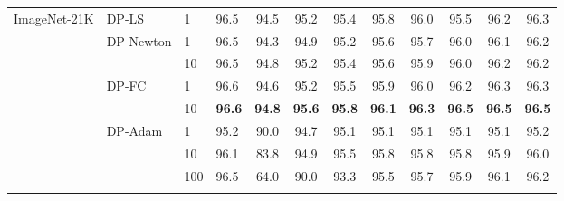 \documentclass[letterpaper]{article} \usepackage{fullpage}
\begin{document}
\begin{table*}[!h]
\begin{tabular}{llll|cccccccc}
		\multirow{8}{*}{ImageNet-21K} &    \multirow{ 1}{*}{DP-LS}
		                                                    & 1     & 96.5        & 94.5 & 95.2 & 95.4 & 95.8 & 96.0 & 95.5 & 96.2 & 96.3 \\ \addlinespace[0.1cm]
\addlinespace[0.1cm]
		                     & \multirow{ 2}{*}{DP-Newton} & 1      & 96.5        & 94.3 & 94.9 & 95.2 & 95.6 & 95.7 & 96.0 & 96.1 & 96.2 \\
		                     &                             & 10     & 96.5        & 94.8 & 95.2 & 95.4 & 95.6 & 95.9 & 96.0 & 96.2 & 96.2 \\
		\addlinespace[0.1cm]
\addlinespace[0.1cm]
		                     & \multirow{ 2}{*}{DP-FC}     & 1      & 96.6        & 94.6 & 95.2 & 95.5 & 95.9 & 96.0 & 96.2 & 96.3 & 96.3 \\
		                     &                             & 10     & \textbf{96.6}        & \textbf{94.8} & \textbf{95.6} & \textbf{95.8} & \textbf{96.1} & \textbf{96.3} & \textbf{96.5} & \textbf{96.5} & \textbf{96.5} \\
		\addlinespace[0.1cm]
\addlinespace[0.1cm]
		                     & \multirow{ 3}{*}{DP-Adam}   & 1      & 95.2        & 90.0 & 94.7 & 95.1 & 95.1 & 95.1 & 95.1 & 95.1 & 95.2 \\
		                     &                             & 10     & 96.1        & 83.8 & 94.9 & 95.5 & 95.8 & 95.8 & 95.8 & 95.9 & 96.0 \\ &                             & 100    & 96.5        & 64.0 & 90.0 & 93.3 & 95.5 & 95.7 & 95.9 & 96.1 & 96.2 \\ 

		\addlinespace[0.2cm]
		\hline
		\addlinespace[0.2cm]
		        

\end{tabular}
\end{table*}
\end{document}
